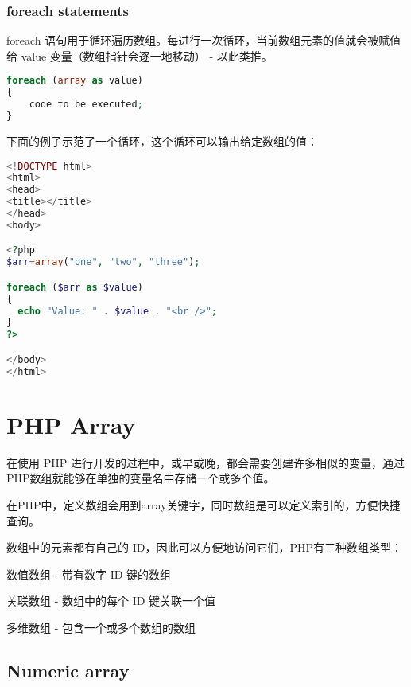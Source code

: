 \subsection{foreach statements}

foreach 语句用于循环遍历数组。每进行一次循环，当前数组元素的值就会被赋值给 value 变量（数组指针会逐一地移动） - 以此类推。


\begin{lstlisting}[language=PHP]
foreach (array as value)
{
    code to be executed;
}
\end{lstlisting}

下面的例子示范了一个循环，这个循环可以输出给定数组的值：

\begin{lstlisting}[language=PHP]
<!DOCTYPE html>
<html>
<head>
<title></title>
</head>
<body>

<?php
$arr=array("one", "two", "three");

foreach ($arr as $value)
{
  echo "Value: " . $value . "<br />";
}
?>

</body>
</html>
\end{lstlisting}





\chapter{PHP Array}



在使用 PHP 进行开发的过程中，或早或晚，都会需要创建许多相似的变量，通过PHP数组就能够在单独的变量名中存储一个或多个值。

在PHP中，定义数组会用到array关键字，同时数组是可以定义索引的，方便快捷查询。

数组中的元素都有自己的 ID，因此可以方便地访问它们，PHP有三种数组类型：

\begin{compactitem}
\item 数值数组 - 带有数字 ID 键的数组

\item 关联数组 - 数组中的每个 ID 键关联一个值

\item 多维数组 - 包含一个或多个数组的数组
\end{compactitem}






\section{Numeric array}

